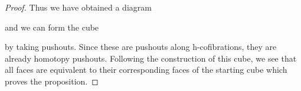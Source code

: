 \begin{prop}
\begin{proof}
        Thus we have obtained a diagram
        \begin{center}
        \end{center}
        and we can form the cube 
        \begin{center}
        \end{center}
        by taking pushouts.
        Since these are pushouts along h-cofibrations, they are already homotopy pushouts. 
        Following the construction of this cube, we see that all faces are equivalent to their corresponding faces of the starting cube which proves the proposition.
    \end{proof}
\end{prop}

